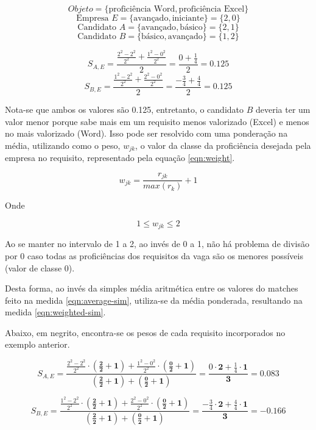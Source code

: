 \documentclass[preprint,12pt]{elsarticle}
\begin{document}
$$ Objeto = \{ \text{proficiência Word}, \text{proficiência Excel} \} $$
$$ \text{Empresa } E = \{ \text{avançado}, \text{iniciante} \} = \{ 2, 0 \} $$
$$ \text{Candidato } A = \{ \text{avançado}, \text{básico} \} = \{ 2, 1 \} $$
$$ \text{Candidato } B = \{ \text{básico}, \text{avançado} \} = \{ 1, 2 \} $$

$$ S_{A,E} = \frac{\tfrac{2^2 - 2^2}{2^2} + \tfrac{1^2 - 0^2}{2^2}}{2} = \frac{0 + \tfrac{1}{4}}{2} =  0.125 $$
$$ S_{B,E} = \frac{\tfrac{1^2 - 2^2}{2^2} + \tfrac{2^2 - 0^2}{2^2}}{2} = \frac{-\tfrac{3}{4} + \tfrac{4}{4}}{2} = 0.125 $$

Nota-se que ambos os valores são 0.125, entretanto, o candidato $B$ deveria ter um valor menor porque sabe mais em um requisito menos valorizado (Excel) e menos no mais valorizado (Word). Isso pode ser resolvido com uma ponderação na média, utilizando como o peso, $w_{jk}$, o valor da classe da proficiência desejada pela empresa no requisito, representado pela equação \ref{eqn:weight}. 

\begin{equation}
\label{eqn:weight}
    w_{jk} = \frac{r_{jk}}{max(r_k)} + 1
\end{equation}

Onde

\begin{equation}
1 \leq w_{jk} \leq 2
\end{equation}

Ao se manter no intervalo de 1 a 2, ao invés de 0 a 1, não há problema de divisão por 0 caso todas as proficiências dos requisitos da vaga são os menores possíveis (valor de classe 0).

Desta forma, ao invés da simples média aritmética entre os valores do matches feito na medida \ref{eqn:average-sim}, utiliza-se da média ponderada, resultando na medida \ref{eqn:weighted-sim}. 

Abaixo, em negrito, encontra-se os pesos de cada requisito incorporados no exemplo anterior.

$$ S_{A,E} = \frac{\tfrac{2^2 - 2^2}{2^2} \cdot \boldsymbol{(\tfrac{2}{2} + 1)} + \tfrac{1^2 - 0^2}{2^2} \cdot \boldsymbol{(\tfrac{0}{2} + 1)}}{\boldsymbol{(\tfrac{2}{2} + 1)} + \boldsymbol{(\tfrac{0}{2} + 1)}} = \frac{0 \cdot \textbf{2} + \tfrac{1}{4} \cdot \textbf{1}}{\textbf{3}} = 0.083 $$

$$ S_{B,E} = \frac{\tfrac{1^2 - 2^2}{2^2} \cdot \boldsymbol{(\tfrac{2}{2} + 1)} + \tfrac{2^2 - 0^2}{2^2} \cdot \boldsymbol{(\tfrac{0}{2} + 1)}}{\boldsymbol{(\tfrac{2}{2} + 1)} + \boldsymbol{(\tfrac{0}{2} + 1)}} = \frac{-\tfrac{3}{4} \cdot \textbf{2} + \tfrac{4}{4} \cdot \textbf{1}}{\textbf{3}} = -0.166 $$
\end{document}
